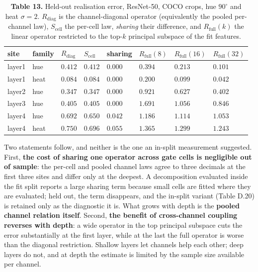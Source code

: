 \begin{table}[t]
\centering
\scriptsize
\caption*{\textbf{Table 13.} Held-out realisation error, ResNet-50, COCO crops, hue $90^\circ$ and heat $\sigma=2$. $R_{\mathrm{diag}}$ is the channel-diagonal operator (equivalently the pooled per-channel law), $S_{\mathrm{cell}}$ the per-cell law, \textit{sharing} their difference, and $R_{\mathrm{full}}(k)$ the linear operator restricted to the top-$k$ principal subspace of the fit features.}
\setlength{\tabcolsep}{2pt}
\begin{tabularx}{\textwidth}{@{}>{\raggedright\arraybackslash}X >{\raggedright\arraybackslash}X >{\raggedright\arraybackslash}X >{\raggedright\arraybackslash}X >{\raggedright\arraybackslash}X >{\raggedright\arraybackslash}X >{\raggedright\arraybackslash}X >{\raggedright\arraybackslash}X@{}}
\toprule
\textbf{site} & \textbf{family} & \textbf{$R_{\mathrm{diag}}$} & \textbf{$S_{\mathrm{cell}}$} & \textbf{sharing} & \textbf{$R_{\mathrm{full}}(8)$} & \textbf{$R_{\mathrm{full}}(16)$} & \textbf{$R_{\mathrm{full}}(32)$} \\
\midrule
layer1 & hue & $0.412$ & $0.412$ & $0.000$ & $0.394$ & $0.213$ & $\mathbf{0.101}$ \\
layer1 & heat & $0.084$ & $0.084$ & $0.000$ & $0.200$ & $0.099$ & $\mathbf{0.042}$ \\
layer2 & hue & $0.347$ & $0.347$ & $0.000$ & $0.921$ & $0.627$ & $0.402$ \\
layer3 & hue & $0.405$ & $0.405$ & $0.000$ & $1.691$ & $1.056$ & $0.846$ \\
layer4 & hue & $0.692$ & $0.650$ & $0.042$ & $1.186$ & $1.114$ & $1.053$ \\
layer4 & heat & $0.750$ & $0.696$ & $0.055$ & $1.365$ & $1.299$ & $1.243$ \\
\bottomrule
\end{tabularx}
\end{table}

Two statements follow, and neither is the one an in-split measurement suggested. First, \textbf{the cost of sharing one operator across gate cells is negligible out of sample}: the per-cell and pooled channel laws agree to three decimals at the first three sites and differ only at the deepest. A decomposition evaluated inside the fit split reports a large sharing term because small cells are fitted where they are evaluated; held out, the term disappears, and the in-split variant (Table D.20) is retained only as the diagnostic it is. What grows with depth is the \textbf{pooled channel relation itself}. Second, \textbf{the benefit of cross-channel coupling reverses with depth}: a wide operator in the top principal subspace cuts the error substantially at the first layer, while at the last the full operator is worse than the diagonal restriction. Shallow layers let channels help each other; deep layers do not, and at depth the estimate is limited by the sample size available per channel.

